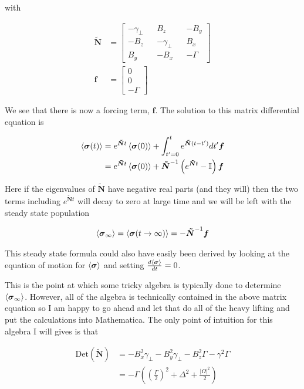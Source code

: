 \documentclass[12pt]{article}
\newcommand{\ddt}[1]{\frac{d #1}{dt}}
\newcommand{\bv}[1]{\boldsymbol{#1}}
\begin{document}
with

\begin{align}
\bv{\tilde{N}} &= \begin{bmatrix}
-\gamma_{\perp} && B_z && -B_y\\
-B_z && -\gamma_{\perp} && B_x\\
B_y && -B_x && -\Gamma
\end{bmatrix}\\
\bv{f} &= \begin{bmatrix}
0\\0\\-\Gamma
\end{bmatrix}
\end{align}

We see that there is now a forcing term, $\bv{f}$. The solution to this matrix differential equation is 

\begin{align}
\Braket{\bv{\sigma}(t)} &= e^{\bv{\tilde{N}} t} \Braket{\bv{\sigma}(0)} + \int_{t'=0}^t e^{\bv{\tilde{N}} (t-t')} dt' \bv{f}\\
&= e^{\bv{\tilde{N}}t} \Braket{\bv{\sigma}(0)} + \bv{\tilde{N}}^{-1}\left(e^{\bv{\tilde{N}}t} - \mathbb{I}\right)\bv{f}
\end{align}

Here if the eigenvalues of $\bv{\tilde{N}}$ have negative real parts (and they will) then the two terms including $e^{\bv{\tilde{N}}t}$ will decay to zero at large time and we will be left with the steady state population

\begin{align}
\Braket{\bv{\sigma}_{\infty}} = \Braket{\bv{\sigma}(t\rightarrow \infty)} = -\bv{\tilde{N}}^{-1} \bv{f}
\end{align}

This steady state formula could also have easily been derived by looking at the equation of motion for $\Braket{\bv{\sigma}}$ and setting $\ddt{\Braket{\bv{\sigma}}} = 0$. 

This is the point at which some tricky algebra is typically done to determine $\Braket{\bv{\sigma}_{\infty}}$. However, all of the algebra is technically contained in the above matrix equation so I am happy to go ahead and let that do all of the heavy lifting and put the calculations into Mathematica. The only point of intuition for this algebra I will gives is that

\begin{align}
\text{Det}(\bv{\tilde{N}}) &= -B_x^2 \gamma_{\perp} - B_y^2 \gamma_{\perp} - B_z^2 \Gamma - \gamma^2 \Gamma\\
&= -\Gamma\left(\left(\frac{\Gamma}{2}\right)^2 + \Delta^2 + \frac{|\Omega|^2}{2} \right)
\end{align}
\end{document}
